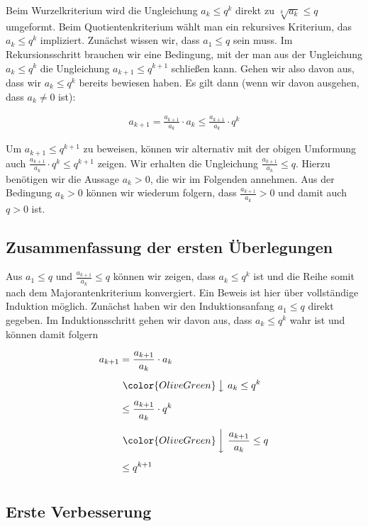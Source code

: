 \documentclass[fontsize=9pt,
               parskip=half-,
               DIV=14,
               listof=chapterentry,
               tocflat]{scrbook}
\begin{document}
Beim Wurzelkriterium wird die Ungleichung $a_{k}\leq q^{k}$ direkt zu ${\sqrt[{k}]{a_{k}}}\leq q$ umgeformt. Beim Quotientenkriterium wählt man ein rekursives Kriterium, das $a_{k}\leq q^{k}$ impliziert. Zunächst wissen wir, dass $a_{1}\leq q$ sein muss. Im Rekursionsschritt brauchen wir eine Bedingung, mit der man aus der Ungleichung $a_{k}\leq q^{k}$ die Ungleichung $a_{k+1}\leq q^{k+1}$ schließen kann. Gehen wir also davon aus, dass wir $a_{k}\leq q^{k}$ bereits bewiesen haben. Es gilt dann (wenn wir davon ausgehen, dass $a_{k}\neq 0$ ist):

\begin{align*}
a_{k+1}={\frac {a_{k+1}}{a_{k}}}\cdot a_{k}\leq {\frac {a_{k+1}}{a_{k}}}\cdot q^{k}
\end{align*}

Um $a_{k+1}\leq q^{k+1}$ zu beweisen, können wir alternativ mit der obigen Umformung auch ${\tfrac {a_{k+1}}{a_{k}}}\cdot q^{k}\leq q^{k+1}$ zeigen. Wir erhalten die Ungleichung ${\tfrac {a_{k+1}}{a_{k}}}\leq q$. Hierzu benötigen wir die Aussage $a_{k}>0$, die wir im Folgenden annehmen. Aus der Bedingung $a_{k}>0$ können wir wiederum folgern, dass ${\tfrac {a_{k+1}}{a_{k}}}>0$ und damit auch $q>0$ ist.

\subsection{Zusammenfassung der ersten Überlegungen}

Aus $a_{1}\leq q$ und ${\tfrac {a_{k+1}}{a_{k}}}\leq q$ können wir zeigen, dass $a_{k}\leq q^{k}$ ist und die Reihe somit nach dem Majorantenkriterium konvergiert. Ein Beweis ist hier über vollständige Induktion möglich. Zunächst haben wir den Induktionsanfang $a_{1}\leq q$ direkt gegeben. Im Induktionsschritt gehen wir davon aus, dass $a_{k}\leq q^{k}$ wahr ist und können damit folgern

\begin{align*}
a_{k+1}&={\frac {a_{k+1}}{a_{k}}}\cdot a_{k}\\[0.5em]&\ {\color {OliveGreen}\left\downarrow \ a_{k}\leq q^{k}\right.}\\[0.5em]&\leq {\frac {a_{k+1}}{a_{k}}}\cdot q^{k}\\[0.5em]&\ {\color {OliveGreen}\left\downarrow \ {\frac {a_{k+1}}{a_{k}}}\leq q\right.}\\[0.5em]&\leq q^{k+1}\\[0.5em]
\end{align*}

\subsection{Erste Verbesserung}
\end{document}
